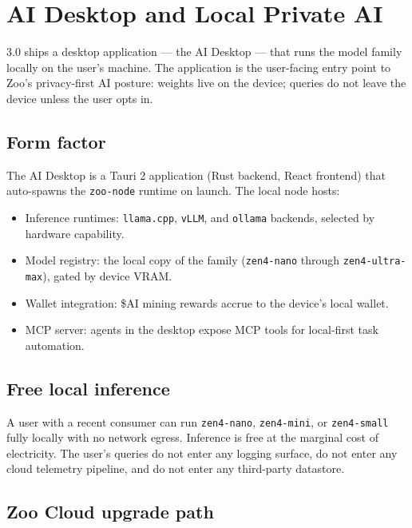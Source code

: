 \section{\Zoo{} AI Desktop and Local Private AI}
\label{sec:ai-desktop}

\Zoo{} 3.0 ships a desktop application --- the \Zoo{} AI Desktop --- that
runs the \Zen{} model family locally on the user's machine. The
application is the user-facing entry point to Zoo's privacy-first AI
posture: weights live on the device; queries do not leave the device
unless the user opts in.

\subsection{Form factor}

The \Zoo{} AI Desktop is a Tauri 2 application (Rust backend, React
frontend) that auto-spawns the \texttt{zoo-node} runtime on launch. The
local node hosts:

\begin{itemize}[leftmargin=1.2em]
  \item Inference runtimes: \texttt{llama.cpp}, \texttt{vLLM}, and
        \texttt{ollama} backends, selected by hardware capability.
  \item Model registry: the local copy of the \Zen{} family
        (\texttt{zen4-nano} through \texttt{zen4-ultra-max}), gated by
        device VRAM.
  \item Wallet integration: \$AI mining rewards accrue to the
        device's local wallet.
  \item MCP server: agents in the desktop expose \Hanzo{} MCP tools for
        local-first task automation.
\end{itemize}

\subsection{Free local inference}

A user with a recent consumer \GPU{} can run \texttt{zen4-nano},
\texttt{zen4-mini}, or \texttt{zen4-small} fully locally with no
network egress. Inference is free at the marginal cost of electricity.
The user's queries do not enter any logging surface, do not enter any
cloud telemetry pipeline, and do not enter any third-party datastore.

\subsection{Zoo Cloud upgrade path}

